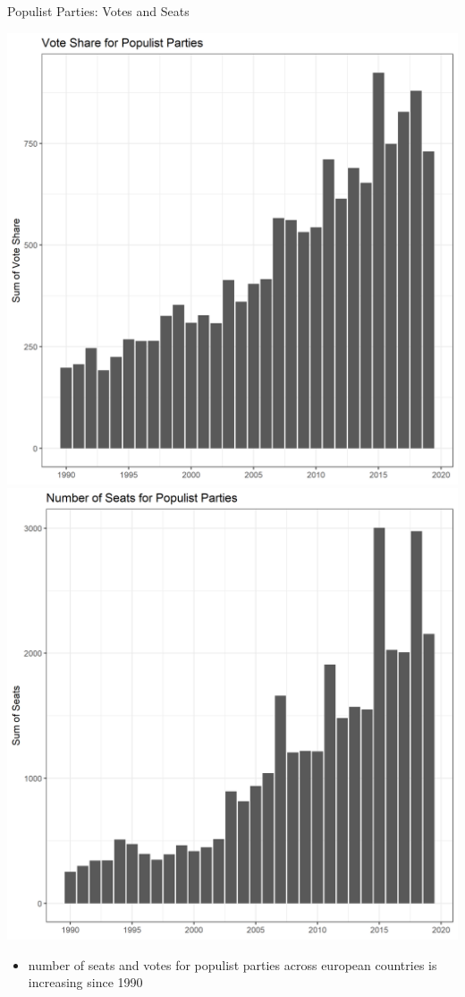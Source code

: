 \documentclass[
  ignorenonframetext,
]{beamer}
\providecommand{\tightlist}{%
  \setlength{\itemsep}{0pt}\setlength{\parskip}{0pt}}
\begin{document}
\begin{frame}{Populist Parties: Votes and Seats}
\protect\hypertarget{populist-parties-votes-and-seats}{}

\begin{center}\includegraphics[width=0.5\linewidth]{PNG/party_vote} \includegraphics[width=0.5\linewidth]{PNG/party_seat} \end{center}

\begin{itemize}
\tightlist
\item
  number of seats and votes for populist parties across european
  countries is increasing since 1990
\end{itemize}

\end{frame}
\end{document}
